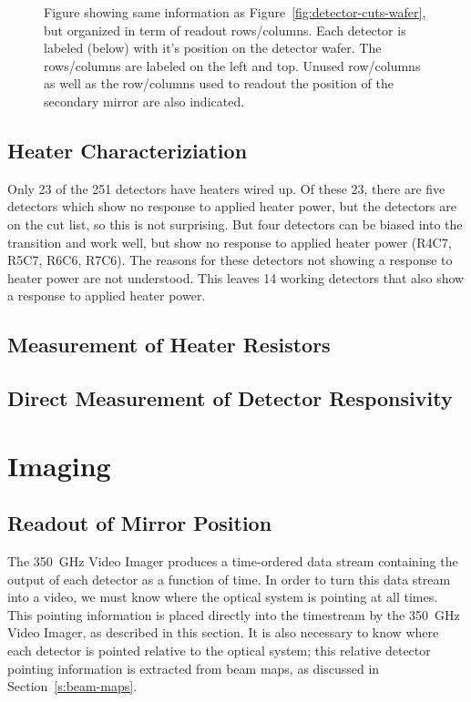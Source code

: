 \documentclass[10pt,twocolumn,article]{memoir}
\newcommand*{\figref}[1]{Figure~\ref{#1}}
\newcommand*{\sectionref}[1]{Section~\ref{#1}}
\newcommand*{\Imager}{350~GHz Video Imager\xspace}
\newcommand*{\RC}[2]{R{#1}C{#2}\xspace}
\begin{document}
\begin{figure}
\centering

\caption{Figure showing same information as \figref{fig:detector-cuts-wafer}, but organized in term of readout rows/columns. Each detector is labeled (below) with it's position on the detector wafer. The rows/columns are labeled on the left and top. Unused row/columns as well as the row/columns used to readout the position of the secondary mirror are also indicated. }
\label{fig:detector-cuts-rc}
\end{figure}

\section{Heater Characteriziation}

Only 23 of the 251 detectors have heaters wired up.
Of these 23, there are five detectors which show no response to applied heater power, but the detectors are on the cut  list, so this is not surprising.
But four detectors can be biased into the transition and work well, but show no response to applied heater power (\RC{4}{7}, \RC{5}{7}, \RC{6}{6}, \RC{7}{6}).
The reasons for these detectors not showing a response to heater power are not understood.
This leaves 14 working detectors that also show a response to applied heater power.


\section{Measurement of Heater Resistors}

\section{Direct Measurement of Detector Responsivity}

\chapter{Imaging}\label{c:imaging}

\section{Readout of Mirror Position}\label{s:mirror-readout}

The \Imager produces a time-ordered data stream containing the output of each detector as a function of time.
In order to turn this data stream into a video, we must know where the optical system is pointing at all times.
This pointing information is placed directly into the timestream by the \Imager, as described in this section.
It is also necessary to know where each detector is pointed relative to the optical system; this relative detector pointing information is extracted from beam maps, as discussed in \sectionref{s:beam-maps}.
\end{document}
